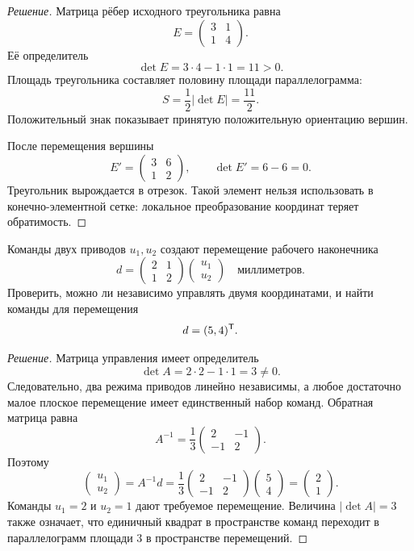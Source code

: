 \begin{proof}[Решение]
Матрица рёбер исходного треугольника равна
\[
E=
\begin{pmatrix}
3&1\\
1&4
\end{pmatrix}.
\]
Её определитель
\[
\det E=3\cdot4-1\cdot1=11>0.
\]
Площадь треугольника составляет половину площади параллелограмма:
\[
S=\frac12\lvert\det E\rvert=\frac{11}{2}.
\]
Положительный знак показывает принятую положительную ориентацию вершин.

После перемещения вершины
\[
E'=
\begin{pmatrix}
3&6\\
1&2
\end{pmatrix},
\qquad
\det E'=6-6=0.
\]
Треугольник вырождается в отрезок. Такой элемент нельзя использовать в конечно-элементной сетке: локальное преобразование координат теряет обратимость.
\end{proof}

\begin{problem}
Команды двух приводов \(u_1,u_2\) создают перемещение рабочего наконечника
\[
d=
\begin{pmatrix}
2&1\\
1&2
\end{pmatrix}
\begin{pmatrix}u_1\\u_2\end{pmatrix}
\quad\text{миллиметров}.
\]
Проверить, можно ли независимо управлять двумя координатами, и найти команды для перемещения
\[
d=(5,4)^{\mathsf{T}}.
\]
\end{problem}

\begin{proof}[Решение]
Матрица управления имеет определитель
\[
\det A=2\cdot2-1\cdot1=3\neq0.
\]
Следовательно, два режима приводов линейно независимы, а любое достаточно малое плоское перемещение имеет единственный набор команд. Обратная матрица равна
\[
A^{-1}=\frac13
\begin{pmatrix}
2&-1\\
-1&2
\end{pmatrix}.
\]
Поэтому
\[
\begin{pmatrix}u_1\\u_2\end{pmatrix}
=A^{-1}d
=
\frac13
\begin{pmatrix}
2&-1\\
-1&2
\end{pmatrix}
\begin{pmatrix}5\\4\end{pmatrix}
=
\begin{pmatrix}2\\1\end{pmatrix}.
\]
Команды \(u_1=2\) и \(u_2=1\) дают требуемое перемещение. Величина \(\lvert\det A\rvert=3\) также означает, что единичный квадрат в пространстве команд переходит в параллелограмм площади \(3\) в пространстве перемещений.
\end{proof}

